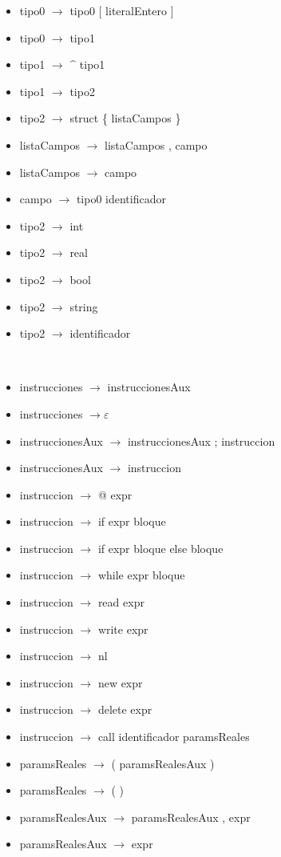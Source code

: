 \documentclass[11pt]{article}
\begin{document}
        \begin{itemize}
            \item tipo0 $\rightarrow$ tipo0 [ literalEntero ]
            \item tipo0 $\rightarrow$ tipo1
            \item tipo1 $\rightarrow$ \^{} tipo1
            \item tipo1 $\rightarrow$ tipo2
            \item tipo2 $\rightarrow$ struct \{ listaCampos \}
            \item listaCampos $\rightarrow$ listaCampos , campo
            \item listaCampos $\rightarrow$ campo
            \item campo $\rightarrow$ tipo0 identificador
            \item tipo2 $\rightarrow$ int
            \item tipo2 $\rightarrow$ real
            \item tipo2 $\rightarrow$ bool
            \item tipo2 $\rightarrow$ string
            \item tipo2 $\rightarrow$ identificador
        \end{itemize}
        \
        \begin{itemize}
            \item instrucciones $\rightarrow$ instruccionesAux
            \item instrucciones $\rightarrow \varepsilon$
            \item instruccionesAux $\rightarrow$ instruccionesAux ; instruccion 
            \item instruccionesAux $\rightarrow$ instruccion 
            \item instruccion  $\rightarrow$ @ expr
            \item instruccion  $\rightarrow$ if expr bloque
            \item instruccion  $\rightarrow$ if expr bloque else bloque
            \item instruccion  $\rightarrow$ while expr bloque
            \item instruccion  $\rightarrow$ read expr
            \item instruccion  $\rightarrow$ write expr
            \item instruccion  $\rightarrow$ nl
            \item instruccion  $\rightarrow$ new expr
            \item instruccion  $\rightarrow$ delete expr
            \item instruccion  $\rightarrow$ call identificador paramsReales
            \item paramsReales $\rightarrow$ ( paramsRealesAux )
            \item paramsReales $\rightarrow$ ( )
            \item paramsRealesAux $\rightarrow$ paramsRealesAux , expr
            \item paramsRealesAux $\rightarrow$ expr
        \end{itemize}
\end{document}
